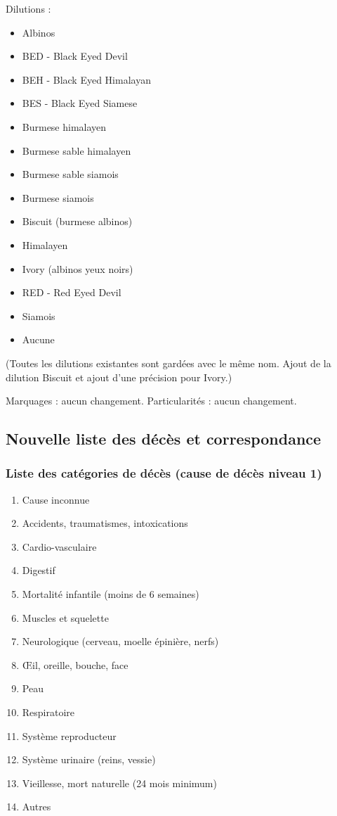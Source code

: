\documentclass[a4paper,10pt]{article}
\begin{document}
Dilutions : 
\begin{itemize}
\item Albinos
\item BED - Black Eyed Devil
\item BEH - Black Eyed Himalayan
\item BES - Black Eyed Siamese
\item Burmese himalayen
\item Burmese sable himalayen
\item Burmese sable siamois
\item Burmese siamois
\item Biscuit (burmese albinos)
\item Himalayen
\item Ivory (albinos yeux noirs)
\item RED - Red Eyed Devil
\item Siamois
\item Aucune
\end{itemize}
(Toutes les dilutions existantes sont gardées avec le même nom. Ajout de la dilution Biscuit et ajout d'une précision pour Ivory.)

Marquages : aucun changement. Particularités : aucun changement.

\subsection{Nouvelle liste des décès et correspondance}
\subsubsection{Liste des catégories de décès (cause de décès niveau 1)}

\begin{enumerate}
\item Cause inconnue
\item Accidents, traumatismes, intoxications
\item Cardio-vasculaire
\item Digestif
\item Mortalité infantile (moins de 6 semaines)
\item Muscles et squelette
\item Neurologique (cerveau, moelle épinière, nerfs)
\item Œil, oreille, bouche, face
\item Peau
\item Respiratoire
\item Système reproducteur
\item Système urinaire (reins, vessie)
\item Vieillesse, mort naturelle (24 mois minimum)
\item Autres
\end{enumerate}
\end{document}
